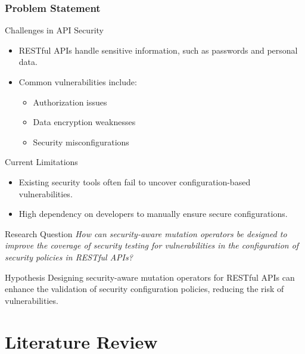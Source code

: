 \documentclass[12pt]{beamer}
\theoremstyle{remark}
\theoremstyle{definition}
\begin{document}
\begin{frame}[allowframebreaks]
\frametitle{Problem Statement}
\begin{block}{Challenges in API Security}
\begin{itemize}
    \item RESTful APIs handle sensitive information, such as passwords and personal data.
    \item Common vulnerabilities include:
    \begin{itemize}
        \item Authorization issues
        \item Data encryption weaknesses
        \item Security misconfigurations
    \end{itemize}
\end{itemize}
\end{block}

\begin{block}{Current Limitations}
\begin{itemize}
    \item Existing security tools often fail to uncover configuration-based vulnerabilities.
    \item High dependency on developers to manually ensure secure configurations.
\end{itemize}
\end{block}

\begin{block}{Research Question}
\textit{How can security-aware mutation operators be designed to improve the coverage of security testing for vulnerabilities in the configuration of security policies in RESTful APIs?}
\end{block}

\begin{block}{Hypothesis}
Designing security-aware mutation operators for RESTful APIs can enhance the validation of security configuration policies, reducing the risk of vulnerabilities.
\end{block}
\end{frame}

\section{Literature Review}
\end{document}
